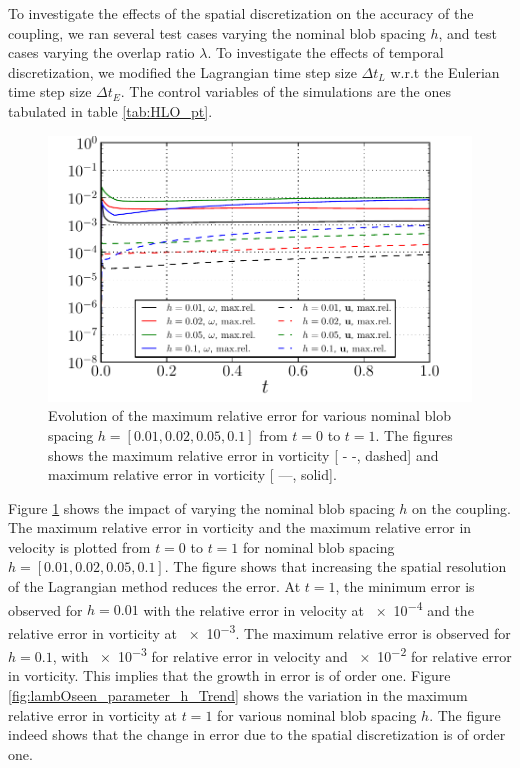 To investigate the effects of the spatial discretization on the accuracy of the coupling, we ran several test cases varying the nominal blob spacing $h$, and test cases varying the overlap ratio $\lambda$. To investigate the effects of temporal discretization, we modified the Lagrangian time step size $\Delta t_L$ w.r.t the Eulerian time step size $\Delta t_E$. The control variables of the simulations are the ones tabulated in table \ref{tab:HLO_pt}.

	\begin{figure}[!b]
	\centering
	\includegraphics[width=0.6\linewidth]{./figures/hybrid/lambOseen/lambOseen_parameter_h.pdf}
	\caption{Evolution of the maximum relative error for various nominal blob spacing $h = [0.01,0.02,0.05,0.1]$ from $t=0$ to $t=1$. The figures shows the maximum relative error in vorticity [ - -, dashed] and maximum relative error in vorticity [ ---, solid].}
	\label{fig:lambOseen_parameter_h}
	\end{figure}	
	
Figure \ref{fig:lambOseen_parameter_h} shows the impact of varying the nominal blob spacing $h$ on the coupling. The maximum relative error in vorticity and the maximum relative error in velocity is plotted from $t=0$ to $t=1$ for nominal blob spacing $h = [0.01,0.02,0.05,0.1]$. The figure shows that increasing the spatial resolution of the Lagrangian method reduces the error. At $t=1$, the minimum error is observed for $h=0.01$ with the relative error in velocity at \num{e-4} and the relative error in vorticity at \num{e-3}. The maximum relative error is observed for $h=0.1$, with \num{e-3} for relative error in velocity and \num{e-2} for relative error in vorticity. This implies that the growth in error is of order one. Figure \ref{fig:lambOseen_parameter_h_Trend} shows the variation in the maximum relative error in vorticity at $t=1$ for various nominal blob spacing $h$. The figure indeed shows that the change in error due to the spatial discretization is of order one.

